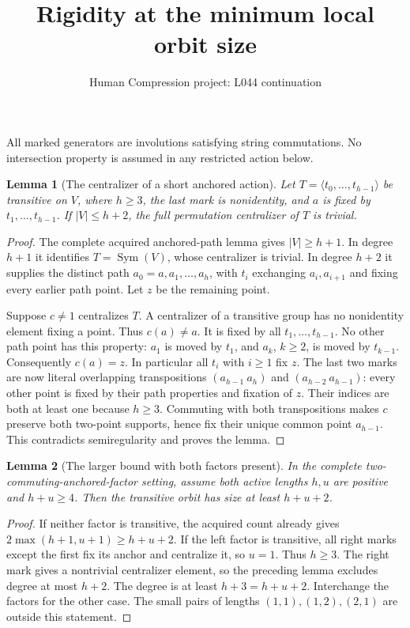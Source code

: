 \documentclass[11pt,a4paper]{article}
\title{Rigidity at the minimum local orbit size}
\author{Human Compression project: L044 continuation}
\date{}
\newtheorem{lemma}{Lemma}
\newcommand{\gen}[1]{\langle#1\rangle}
\newcommand{\Sym}{\operatorname{Sym}}
\begin{document}
\maketitle
All marked generators are involutions satisfying string
commutations. No intersection property is assumed in
any restricted action below.

\begin{lemma}[The centralizer of a short anchored action]
Let $T=\gen{t_0,\ldots,t_{h-1}}$ be transitive on $V$,
where $h\ge3$, the last mark is nonidentity, and $a$
is fixed by $t_1,\ldots,t_{h-1}$. If $|V|\le h+2$,
the full permutation centralizer of $T$ is trivial.
\end{lemma}
\begin{proof}
The complete acquired anchored-path lemma gives
$|V|\ge h+1$. In degree $h+1$ it identifies
$T=\Sym(V)$, whose centralizer is trivial.
In degree $h+2$ it supplies the distinct path
$a_0=a,a_1,\ldots,a_h$, with $t_i$ exchanging
$a_i,a_{i+1}$ and fixing every earlier path point.
Let $z$ be the remaining point.

Suppose $c\ne1$ centralizes $T$. A centralizer of
a transitive group has no nonidentity element fixing
a point. Thus $c(a)\ne a$. It is fixed by all
$t_1,\ldots,t_{h-1}$. No other path point has this
property: $a_1$ is moved by $t_1$, and $a_k$, $k\ge2$,
is moved by $t_{k-1}$. Consequently $c(a)=z$.
In particular all $t_i$ with $i\ge1$ fix $z$.
The last two marks are now literal overlapping
transpositions $(a_{h-1}\ a_h)$ and
$(a_{h-2}\ a_{h-1})$: every other point is fixed
by their path properties and fixation of $z$.
Their indices are both at least one because $h\ge3$.
Commuting with both transpositions makes $c$
preserve both two-point supports, hence fix their
unique common point $a_{h-1}$. This contradicts
semiregularity and proves the lemma.
\end{proof}

\begin{lemma}[The larger bound with both factors present]
In the complete two-commuting-anchored-factor setting,
assume both active lengths $h,u$ are positive and
$h+u\ge4$. Then the transitive orbit has size at
least $h+u+2$.
\end{lemma}
\begin{proof}
If neither factor is transitive, the acquired count
already gives $2\max(h+1,u+1)\ge h+u+2$.
If the left factor is transitive, all right marks
except the first fix its anchor and centralize it,
so $u=1$. Thus $h\ge3$. The right mark gives a
nontrivial centralizer element, so the preceding
lemma excludes degree at most $h+2$. The degree
is at least $h+3=h+u+2$. Interchange the factors
for the other case. The small pairs of lengths
$(1,1),(1,2),(2,1)$ are outside this statement.
\end{proof}
\end{document}
